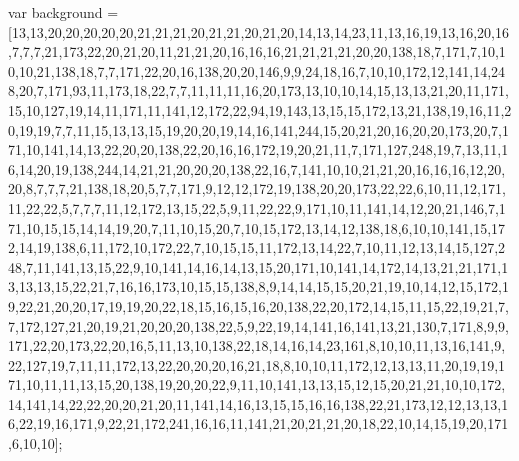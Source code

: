 var background = [13,13,20,20,20,20,20,21,21,21,20,21,21,20,21,20,14,13,14,23,11,13,16,19,13,16,20,16,7,7,7,21,173,22,20,21,20,11,21,21,20,16,16,16,21,21,21,21,20,20,138,18,7,171,7,10,10,10,21,138,18,7,7,171,22,20,16,138,20,20,146,9,9,24,18,16,7,10,10,172,12,141,14,248,20,7,171,93,11,173,18,22,7,7,11,11,11,16,20,173,13,10,10,14,15,13,13,21,20,11,171,15,10,127,19,14,11,171,11,141,12,172,22,94,19,143,13,15,15,172,13,21,138,19,16,11,20,19,19,7,7,11,15,13,13,15,19,20,20,19,14,16,141,244,15,20,21,20,16,20,20,173,20,7,171,10,141,14,13,22,20,20,138,22,20,16,16,172,19,20,21,11,7,171,127,248,19,7,13,11,16,14,20,19,138,244,14,21,21,20,20,20,138,22,16,7,141,10,10,21,21,20,16,16,16,12,20,20,8,7,7,7,21,138,18,20,5,7,7,171,9,12,12,172,19,138,20,20,173,22,22,6,10,11,12,171,11,22,22,5,7,7,7,11,12,172,13,15,22,5,9,11,22,22,9,171,10,11,141,14,12,20,21,146,7,171,10,15,15,14,14,19,20,7,11,10,15,20,7,10,15,172,13,14,12,138,18,6,10,10,141,15,172,14,19,138,6,11,172,10,172,22,7,10,15,15,11,172,13,14,22,7,10,11,12,13,14,15,127,248,7,11,141,13,15,22,9,10,141,14,16,14,13,15,20,171,10,141,14,172,14,13,21,21,171,13,13,13,15,22,21,7,16,16,173,10,15,15,138,8,9,14,14,15,15,20,21,19,10,14,12,15,172,19,22,21,20,20,17,19,19,20,22,18,15,16,15,16,20,138,22,20,172,14,15,11,15,22,19,21,7,7,172,127,21,20,19,21,20,20,20,138,22,5,9,22,19,14,141,16,141,13,21,130,7,171,8,9,9,171,22,20,173,22,20,16,5,11,13,10,138,22,18,14,16,14,23,161,8,10,10,11,13,16,141,9,22,127,19,7,11,11,172,13,22,20,20,20,16,21,18,8,10,10,11,172,12,13,13,11,20,19,19,171,10,11,11,13,15,20,138,19,20,20,22,9,11,10,141,13,13,15,12,15,20,21,21,10,10,172,14,141,14,22,22,20,20,21,20,11,141,14,16,13,15,15,16,16,138,22,21,173,12,12,13,13,16,22,19,16,171,9,22,21,172,241,16,16,11,141,21,20,21,21,20,18,22,10,14,15,19,20,171,6,10,10];

